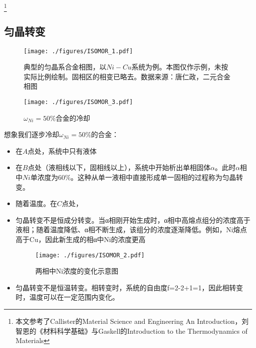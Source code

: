 \footnote{本文参考了Callister的Material Science and Engineering An Introduction，刘智恩的《材料科学基础》与Gaskell的Introduction to the Thermodynamics of Materials}

\subsection{匀晶转变}

\begin{figure}[ht]
\centering
\texttt{[image: ./figures/ISOMOR\_1.pdf]}
\caption{典型的匀晶系合金相图，以$Ni-Cu$系统为例。本图仅作示例，未按实际比例绘制。固相区的相变已略去。数据来源：唐仁政，二元合金相图} \label{ISOMOR_fig1}
\end{figure}

\begin{figure}[ht]
\centering
\texttt{[image: ./figures/ISOMOR\_3.pdf]}
\caption{$\omega_{Ni}=50\%$合金的冷却} \label{ISOMOR_fig3}
\end{figure}


想象我们逐步冷却$\omega_{Ni}=50\%$的合金：
\begin{itemize}
\item 在$A$点处，系统中只有液体
\item 在$B$点处（液相线以下，固相线以上），系统中开始析出单相固体$\alpha$。此时$\alpha$相中$Ni$单浓度为$60\%$。这种从单一液相中直接形成单一固相的过程称为匀晶转变。
\item 随着温度。在$C$点处，
\end{itemize}


\begin{itemize}
\item 匀晶转变不是恒成分转变。当α相刚开始生成时，α相中高熔点组分的浓度高于液相；随着温度降低、α相不断生成，该组分的浓度逐渐降低。例如，Ni熔点高于Cu，因此新生成的相α中Ni的浓度更高
\begin{figure}[ht]
\centering
\texttt{[image: ./figures/ISOMOR\_2.pdf]}
\caption{两相中Ni浓度的变化示意图} \label{ISOMOR_fig2}
\end{figure}

\item 匀晶转变不是恒温转变。相转变时，系统的自由度f=2-2+1=1，因此相转变时，温度可以在一定范围内变化。
\end{itemize}

